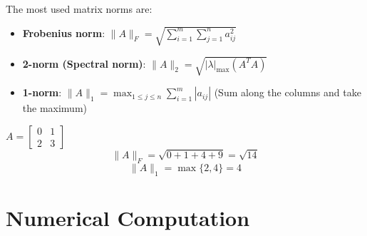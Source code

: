 \documentclass{article}
\begin{document}
The most used matrix norms are:
\begin{itemize}
    \item \textbf{Frobenius norm}: $\lVert
        A\rVert_F=\sqrt{\sum_{i=1}^{m}\sum_{j=1}^{n}a_{ij}^2}$
    \item \textbf{2-norm (Spectral norm)}: $\lVert A\rVert_2=\sqrt{\left\lvert
        \lambda\right\rvert_{\max}(A^TA)}$
    \item \textbf{1-norm}: $\lVert A\rVert_1=\max_{1\leq j\leq
        n}\sum_{i=1}^{m}\left\lvert a_{ij}\right\rvert$ (Sum along the columns
        and take the maximum)
\end{itemize}
\begin{example}
   $A=\begin{bmatrix}
       0 & 1 \\ 
       2 & 3
   \end{bmatrix}$ 
   $$\lVert A\rVert_F=\sqrt{0+1+4+9}=\sqrt{14}$$
   $$\lVert A\rVert_1=\max\{2,4\}=4$$
\end{example}
\cleardoublepage
\section{Numerical Computation}
\end{document}
